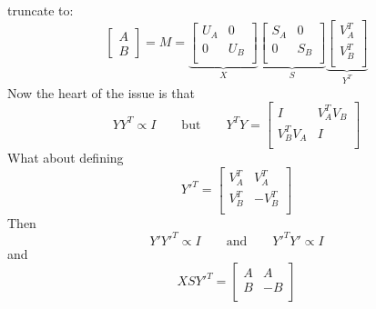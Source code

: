 \documentclass[11pt]{article}
\begin{document}
truncate to:
\[
\left[ \begin{array}{c} 
A \\
B
\end{array} \right] = M =
\underbrace{\left[ \begin{array}{cc} 
U_A & 0 \\
0 & U_B \\
\end{array} \right]}_{X} 
\underbrace{\left[ \begin{array}{cc} 
S_A & 0 \\
0 & S_B \\
\end{array} \right]}_{S} 
\underbrace{\left[ \begin{array}{c} 
V_A^T\\
V_B^T\\
\end{array} \right]}_{Y^T} 
\]
Now the heart of the issue is that 
\[Y Y^T \propto I \qquad \text{but} \qquad Y^T Y = \left[ \begin{array}{cc} 
I & V_A^TV_B \\
V_B^TV_A & I \\
\end{array} \right]\] 
What about defining
\[Y'^T = \left[ \begin{array}{cc} 
V_A^T & V_A^T\\
V_B^T & -V_B^T\\
\end{array} \right]
\]
Then
\[Y'Y'^T \propto I \qquad \text{and} \qquad  Y'^T Y' \propto I\]
and
\[
XSY'^T = \left[ \begin{array}{cc}
A & A\\
B & -B\\
\end{array} \right]
\]
\end{document}
